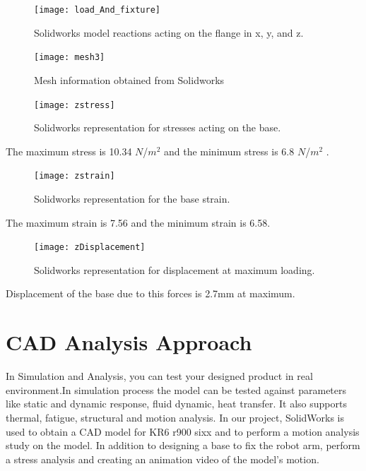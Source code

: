 \begin{figure}[H]
	
	\centering
	\texttt{[image: load\_And\_fixture]}
	\caption{Solidworks model reactions acting on the flange in x, y, and z.} 
\end{figure}


\begin{figure}[H]
	\centering
	\texttt{[image: mesh3]}
	\caption{Mesh information obtained from Solidworks} 
\end{figure}

\begin{figure}[H]
	\centering
	\texttt{[image: zstress]}
	\caption{Solidworks representation for stresses acting on the base.} 
\end{figure}
\begin{center}
	The maximum stress is 10.34 $N$/$m^{2}$ and the minimum stress is 6.8 $N$/$m^{2}$ .
\end{center}

\begin{figure}[H]
	\centering
	\texttt{[image: zstrain]}
	\caption{Solidworks representation for the base strain.} 
\end{figure}
\begin{center}
	The maximum strain is 7.56 and the minimum strain is 6.58.
\end{center}
\begin{figure}[H]
	\centering
	\texttt{[image: zDisplacement]}
	\caption{Solidworks representation for displacement at maximum loading.} 
\end{figure}
\begin{center}
	 Displacement of the base due to this forces is 2.7mm at maximum.
\end{center}


\newpage
\section{CAD Analysis Approach}

In Simulation and Analysis, you can test your designed product in real environment.In simulation process the model can be tested against parameters like static and dynamic response, fluid dynamic, heat transfer. It also supports thermal, fatigue, structural and motion analysis. 
\newline In our project, SolidWorks is used to obtain a CAD model for KR6 r900 sixx and to perform a motion analysis study on the model. In addition to designing a base to fix the robot arm, perform a stress analysis and creating an animation video of the model’s motion.

